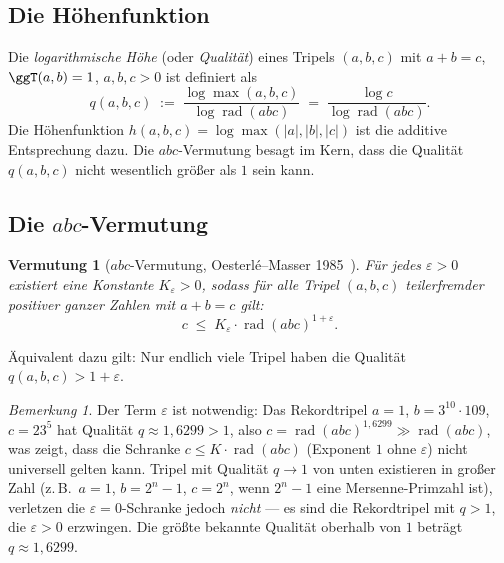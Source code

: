 \documentclass[12pt,a4paper]{article}
\newtheorem{conjecture}[theorem]{Vermutung}
\theoremstyle{remark}
\newtheorem{remark}[theorem]{Bemerkung}
\begin{document}
\subsection{Die Höhenfunktion}

Die \emph{logarithmische Höhe} (oder \emph{Qualität}) eines Tripels $(a, b, c)$ mit
$a+b=c$, $\ggT(a,b)=1$, $a,b,c>0$ ist definiert als
\begin{equation}\label{eq:qualitaet}
  q(a,b,c) \;:=\; \frac{\log\max(a,b,c)}{\log\operatorname{rad}(abc)}
             \;=\; \frac{\log c}{\log\operatorname{rad}(abc)}.
\end{equation}
Die Höhenfunktion $h(a,b,c) = \log\max(|a|,|b|,|c|)$ ist die additive Entsprechung dazu.
Die $abc$-Vermutung besagt im Kern, dass die Qualität $q(a,b,c)$ nicht wesentlich
größer als $1$ sein kann.

\subsection{Die $abc$-Vermutung}

\begin{conjecture}[$abc$-Vermutung, Oesterlé--Masser 1985~\cite{Oesterle1988,Masser1985}]
  Für jedes $\varepsilon > 0$ existiert eine Konstante $K_\varepsilon > 0$, sodass für
  alle Tripel $(a,b,c)$ teilerfremder positiver ganzer Zahlen mit $a + b = c$ gilt:
  \begin{equation}\label{eq:abc}
    c \;\leq\; K_\varepsilon \cdot \operatorname{rad}(abc)^{1+\varepsilon}.
  \end{equation}
\end{conjecture}

Äquivalent dazu gilt: Nur endlich viele Tripel haben die Qualität $q(a,b,c) > 1+\varepsilon$.

\begin{remark}
  Der Term $\varepsilon$ ist notwendig: Das Rekordtripel $a=1$, $b=3^{10}\cdot109$,
  $c=23^5$ hat Qualität $q \approx 1{,}6299 > 1$, also $c = \operatorname{rad}(abc)^{1{,}6299}
  \gg \operatorname{rad}(abc)$, was zeigt, dass die Schranke $c \leq K \cdot \operatorname{rad}(abc)$
  (Exponent $1$ ohne $\varepsilon$) nicht universell gelten kann.  Tripel mit Qualität
  $q \to 1$ von unten existieren in großer Zahl (z.\,B.\ $a=1$, $b=2^n-1$, $c=2^n$,
  wenn $2^n-1$ eine Mersenne-Primzahl ist), verletzen die $\varepsilon=0$-Schranke
  jedoch \emph{nicht} — es sind die Rekordtripel mit $q > 1$, die $\varepsilon > 0$
  erzwingen.  Die größte bekannte Qualität oberhalb von $1$ beträgt $q \approx 1{,}6299$.
\end{remark}
\end{document}
